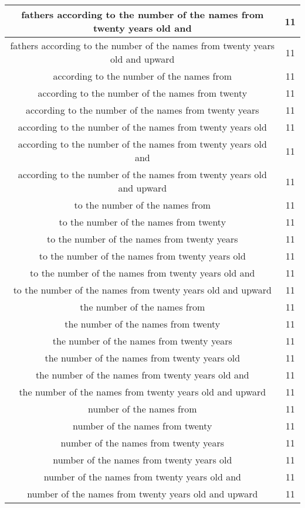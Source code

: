 \begin{center}
\begin{longtable}{|c|c|}
fathers according to the number of the names from twenty years old and & 11\\ \hline 
fathers according to the number of the names from twenty years old and upward & 11\\ \hline 
according to the number of the names from & 11\\ \hline 
according to the number of the names from twenty & 11\\ \hline 
according to the number of the names from twenty years & 11\\ \hline 
according to the number of the names from twenty years old & 11\\ \hline 
according to the number of the names from twenty years old and & 11\\ \hline 
according to the number of the names from twenty years old and upward & 11\\ \hline 
to the number of the names from & 11\\ \hline 
to the number of the names from twenty & 11\\ \hline 
to the number of the names from twenty years & 11\\ \hline 
to the number of the names from twenty years old & 11\\ \hline 
to the number of the names from twenty years old and & 11\\ \hline 
to the number of the names from twenty years old and upward & 11\\ \hline 
the number of the names from & 11\\ \hline 
the number of the names from twenty & 11\\ \hline 
the number of the names from twenty years & 11\\ \hline 
the number of the names from twenty years old & 11\\ \hline 
the number of the names from twenty years old and & 11\\ \hline 
the number of the names from twenty years old and upward & 11\\ \hline 
number of the names from & 11\\ \hline 
number of the names from twenty & 11\\ \hline 
number of the names from twenty years & 11\\ \hline 
number of the names from twenty years old & 11\\ \hline 
number of the names from twenty years old and & 11\\ \hline 
number of the names from twenty years old and upward & 11\\ \hline 

\end{longtable}
\end{center}
